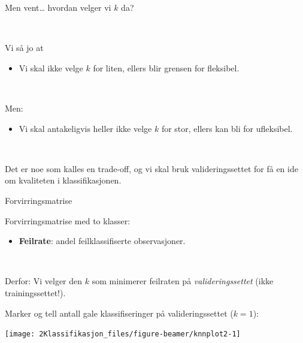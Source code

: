 \documentclass[10pt,ignorenonframetext,]{beamer}
\providecommand{\tightlist}{%
  \setlength{\itemsep}{0pt}\setlength{\parskip}{0pt}}
\begin{document}
\begin{frame}

\begin{block}{Men vent\ldots{} hvordan velger vi \(k\) da?}

\(~\)

Vi så jo at

\begin{itemize}
\tightlist
\item
  Vi skal ikke velge \(k\) for liten, ellers blir grensen for fleksibel.
\end{itemize}

\(~\)

Men:

\begin{itemize}
\tightlist
\item
  Vi skal antakeligvis heller ikke velge \(k\) for stor, ellers kan bli
  for ufleksibel.
\end{itemize}

\(~\)

Det er noe som kalles en trade-off, og vi skal bruk valideringssettet
for få en ide om kvaliteten i klassifikasjonen.

\end{block}

\end{frame}

\begin{frame}

\begin{block}{Forvirringsmatrise}

Forvirringsmatrise med to klasser:

\vspace{4cm}

\begin{itemize}
\tightlist
\item
  \textbf{Feilrate}: andel feilklassifiserte observasjoner.
\end{itemize}

\(~\)

\centering

Derfor: Vi velger den \(k\) som minimerer feilraten på
\emph{valideringssettet} (ikke trainingssettet!).

\end{block}

\end{frame}

\begin{frame}

Marker og tell antall gale klassifiseringer på valideringssettet
(\(k=1\)):

\begin{center}\texttt{[image: 2Klassifikasjon\_files/figure-beamer/knnplot2-1]} \end{center}

\end{frame}
\end{document}
